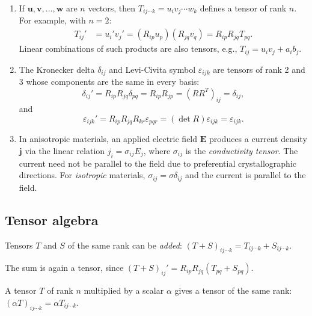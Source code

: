 \documentclass[a4paper]{article}
\begin{document}
\begin{eg}\leavevmode
  \begin{enumerate}
    \item If $\mathbf{u}, \mathbf{v}, \ldots, \mathbf{w}$ are $n$ vectors, then $T_{ij\cdots k} = u_i v_j \cdots w_k$ defines a tensor of rank $n$. For example, with $n = 2$:
      \begin{align*}
        T_{ij}' &= u_i'v_j' = (R_{ip} u_p)(R_{jq}v_q) = R_{ip}R_{jq}T_{pq}.
      \end{align*}
      Linear combinations of such products are also tensors, e.g., $T_{ij} = u_i v_j + a_ib_j$.
    \item The Kronecker delta $\delta_{ij}$ and Levi-Civita symbol $\varepsilon_{ijk}$ are tensors of rank 2 and 3 whose components are the same in every basis:
      \[
        \delta_{ij}' = R_{ip}R_{jq}\delta_{pq} = R_{ip}R_{jp} = (RR^T)_{ij} = \delta_{ij},
      \]
      and
      \[
        \varepsilon_{ijk}' = R_{ip}R_{jq}R_{kr}\varepsilon_{pqr} = (\det R)\varepsilon_{ijk} = \varepsilon_{ijk}.
      \]
    \item In anisotropic materials, an applied electric field $\mathbf{E}$ produces a current density $\mathbf{j}$ via the linear relation $j_i = \sigma_{ij} E_j$, where $\sigma_{ij}$ is the \emph{conductivity tensor}. The current need not be parallel to the field due to preferential crystallographic directions. For \emph{isotropic} materials, $\sigma_{ij} = \sigma\delta_{ij}$ and the current is parallel to the field.
  \end{enumerate}
\end{eg}

\subsection{Tensor algebra}
\begin{defi}
  Tensors $T$ and $S$ of the same rank can be \emph{added}: $(T + S)_{ij\cdots k} = T_{ij \cdots k} + S_{ij\cdots k}$.
\end{defi}

The sum is again a tensor, since $(T + S)_{ij}' = R_{ip}R_{jq}(T_{pq} + S_{pq})$.

\begin{defi}
  A tensor $T$ of rank $n$ multiplied by a scalar $\alpha$ gives a tensor of the same rank: $(\alpha T)_{ij\cdots k} = \alpha T_{ij\cdots k}$.
\end{defi}
\end{document}
